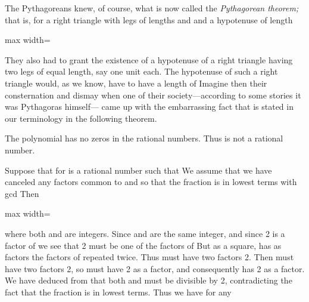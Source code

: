 \documentclass[11pt,oneside]{article}
\begin{document}
\begin{BookBody}

The Pythagoreans knew, of course, what is now called the\textit{ Pythagorean theorem;} that is, for a right triangle with legs of lengths  and  and a hypotenuse of length 

\begin{center}\begin{adjustbox}{max width=\linewidth}\end{adjustbox}\end{center}

\noindent They also had to grant the existence of a hypotenuse of a right triangle having two legs of equal length, say one unit each. The hypotenuse of such a right triangle would, as we know, have to have a length of  Imagine then their consternation and dismay when one of their society—according to some stories it was Pythagoras himself— came up with the embarrassing fact that is stated in our terminology in the following theorem.

 The polynomial  has no zeros in the rational numbers. Thus  is not a rational number.

 Suppose that  for  is a rational number such that  We assume that we have canceled any factors common to  and  so that the fraction  is in lowest terms with gcd Then

\begin{center}\begin{adjustbox}{max width=\linewidth}\end{adjustbox}\end{center}

\noindent where both  and  are integers. Since  and  are the same integer, and since 2 is a factor of  we see that 2 must be one of the factors of  But as a square,  has as factors the factors of  repeated twice. Thus  must have two factors 2. Then  must have two factors 2, so  must have 2 as a factor, and consequently  has 2 as a factor. We have deduced from  that both  and  must be divisible by 2, contradicting the fact that the fraction  is in lowest terms. Thus we have  for any \BookEnd{\blacklozenge}


\end{BookBody}
\end{document}
